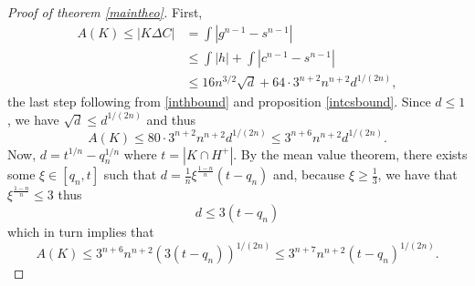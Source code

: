 \documentclass[12pt,reqno]{amsart}
\theoremstyle{plain}
\theoremstyle{definition}
\theoremstyle{remark}
\numberwithin{equation}{section}
\begin{document}
\begin{proof}[Proof of theorem \ref{maintheo}]

First,
\begin{align*}
    A(K)\leq |K\Delta C|&=\int |g^{n-1}-s^{n-1}|\\
    &\leq \int |h|+\int|c^{n-1}-s^{n-1}|\\
    &\leq 16n^{3/2}\sqrt{d} +64\cdot 3^{n+2}n^{n+2}d^{1/(2n)},
\end{align*} the last step following from \eqref{inthbound} and proposition \ref{intcsbound}. Since $d\leq 1$, we have $\sqrt{d}\leq d^{1/(2n)}$ and thus
$$A(K)\leq 80\cdot 3^{n+2}n^{n+2}d^{1/(2n)}\leq 3^{n+6}n^{n+2}d^{1/(2n)}.$$
Now, $d=t^{1/n}-q_n^{1/n}$ where $t=|K\cap H^+|$. By the mean value theorem, there exists some $\xi\in [q_n,t]$ such that $d=\frac 1 n\xi^\frac{1-n}{n} (t-q_n)$ and, because $\xi\geq \frac 13$, we have that $\xi^{\frac{1-n}{n}}\leq 3$ thus
$$d\leq 3(t-q_n)$$
which in turn implies that
$$A(K)\leq 3^{n+6}n^{n+2}(3(t-q_n))^{1/(2n)}\leq 3^{n+7}n^{n+2}(t-q_n)^{1/(2n)}.$$

\end{proof}
\end{document}
